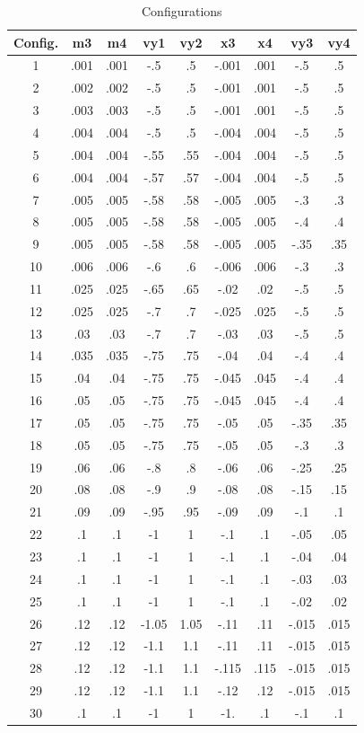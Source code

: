 \documentclass[a4paper,12pt]{article}
\begin{document}
\begin{table}[ht!]
  \centering
  \caption{Configurations}
  \label{tab:variables}
  \begin{tabular}{ccccccccc}
   Config. & m3 & m4 & vy1 & vy2 & x3 & x4 & vy3 & vy4\\
    \hline
   1 & .001 & .001 & -.5 & .5 & -.001 & .001 & -.5 & .5\\
   2 & .002 & .002 & -.5 & .5 & -.001 & .001 & -.5 & .5\\
   3 & .003 & .003 & -.5 & .5 & -.001 & .001 & -.5 & .5\\
   4 & .004 & .004 & -.5 & .5 & -.004 & .004 & -.5 & .5\\
   5 & .004 & .004 & -.55 & .55 & -.004 & .004 & -.5 & .5\\
   6 & .004 & .004 & -.57 & .57 & -.004 & .004 & -.5 & .5\\
   7 & .005 & .005 & -.58 & .58 & -.005 & .005 & -.3 & .3\\
   8 & .005 & .005 & -.58 & .58 & -.005 & .005 & -.4 & .4\\
   9 & .005 & .005 & -.58 & .58 & -.005 & .005 & -.35 & .35\\
   10 & .006 & .006 & -.6 & .6 & -.006 & .006 & -.3 & .3\\
   11 & .025 & .025 & -.65 & .65 & -.02 & .02 & -.5 & .5\\
   12 & .025 & .025 & -.7 & .7 & -.025 & .025 & -.5 & .5\\
   13 & .03 & .03 & -.7 & .7 & -.03 & .03 &-.5 & .5\\
   14 & .035 & .035 & -.75 & .75 & -.04 & .04 &-.4 & .4\\
   15 & .04 & .04 & -.75 & .75 & -.045 & .045 &-.4 & .4\\
   16 & .05 & .05 & -.75 & .75 & -.045 & .045 &-.4 & .4\\
   17 & .05 & .05 & -.75 & .75 & -.05 & .05 &-.35 & .35\\
   18 & .05 & .05 & -.75 & .75 & -.05 & .05 &-.3 & .3\\
   19 & .06 & .06 & -.8 & .8 & -.06 & .06 &-.25 & .25\\
   20 & .08 & .08 & -.9 & .9 & -.08 & .08 &-.15 & .15\\
   21 & .09 & .09 & -.95 & .95 & -.09 & .09 &-.1 & .1\\
   22 & .1 & .1 & -1 & 1 & -.1 & .1 & -.05 & .05\\
   23 & .1 & .1 & -1 & 1 & -.1 & .1 & -.04 & .04\\
   24 & .1 & .1 & -1 & 1 & -.1 & .1 & -.03 & .03\\
   25 & .1 & .1 & -1 & 1 & -.1 & .1 & -.02 & .02\\
   26 & .12 & .12 & -1.05 & 1.05 & -.11 & .11 & -.015 & .015\\
   27 & .12 & .12 & -1.1 & 1.1 & -.11 & .11 & -.015 & .015\\
   28 & .12 & .12 & -1.1 & 1.1 & -.115 & .115 & -.015 & .015\\
   29 & .12 & .12 & -1.1 & 1.1 & -.12 & .12 & -.015 & .015\\
   30 & .1 & .1 & -1 & 1 &-1. & .1 & -.1 & .1\\
  \end{tabular}
\end{table}
\end{document}
